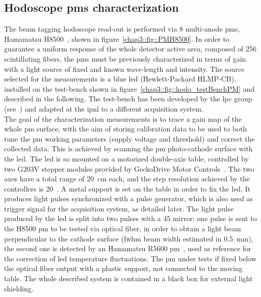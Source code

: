 \subsection{Hodoscope \glspl{pm} characterization}\label{chap3::subsec::hodoPMchar}         

The beam tagging hodoscope read-out is performed via 8 multi-anode \glspl{pm}, Hamamatsu H8500~\parencite{Hamamatsu2006}, shown in figure~\ref{chap3::fig::PMH8500}. In order to guarantee a uniform response of the whole detector active area, composed of 256 scintillating fibers, the \glspl{pm} must be previously characterized in terms of gain with a light source of fixed and known wave-length and intensity. The source selected for the measurements is a blue \gls{led} (Hewlett-Packard HLMP-CB), installed on the test-bench shown in figure~\ref{chap3::fig::hodo_testBenchPM} and described in the following. The test-bench has been developed by the \gls{lpc} group (see~\cite{Gaglione2013}) and adapted at the \gls{ipnl} to a different acquisition system.\\
The goal of the characterization measurements is to trace a gain map of the whole \gls{pm} surface, with the aim of storing calibration data to be used to both tune the \gls{pm} working parameters (supply voltage and threshold) and correct the collected data. This is achieved by scanning the \gls{pm} photo-cathode surface with the \gls{led}. The \gls{led} is so mounted on a motorized double-axis table, controlled by two G203V stepper modules provided by GeckoDrive Motor Controls~\parencite{GeckoDrive2010}. The two axes have a total range of 20~cm each, and the step resolution achieved by the controllers is 20~\charmum. A metal support is set on the table in order to fix the \gls{led}. It produces light pulses synchronized with a pulse generator, which is also used as trigger signal for the acquisition system, as detailed later. The light pulse produced by the \gls{led} is split into two pulses with a 45\textdegree{} mirror: one pulse is sent to the H8500 \gls{pm} to be tested via optical fiber, in order to obtain a light beam perpendicular to the cathode surface (\gls{fwhm} beam width estimated in 0.5~mm), the second one is detected by an Hamamatsu R5600 \gls{pm}~\parencite{Hamamatsu1995}, used as reference for the correction of \gls{led} temperature fluctuations. The \gls{pm} under tests if fixed below the optical fiber output with a plastic support, not connected to the moving table. The whole described system is contained in a black box for external light shielding.\\
